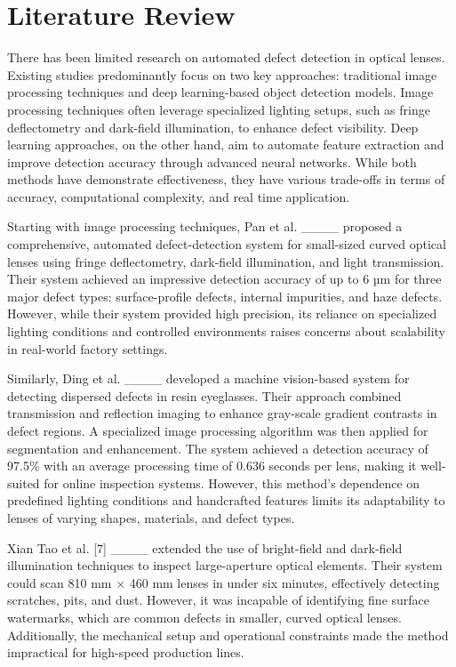 \section{Literature Review}
There has been limited research on automated defect detection in optical lenses. Existing studies predominantly focus on two key approaches: traditional image processing techniques and deep learning-based object detection models. Image processing techniques often leverage specialized lighting setups, such as fringe deflectometry and dark-field illumination, to enhance defect visibility. Deep learning approaches, on the other hand, aim to automate feature extraction and improve detection accuracy through advanced neural networks. While both methods have demonstrate effectiveness, they have various trade-offs in terms of accuracy, computational complexity, and real time application.

Starting with image processing techniques, Pan et al. ____ proposed a comprehensive, automated defect-detection system for small-sized curved optical lenses using fringe deflectometry, dark-field illumination, and light transmission. Their system achieved an impressive detection accuracy of up to 6 µm for three major defect types: surface-profile defects, internal impurities, and haze defects. However, while their system provided high precision, its reliance on specialized lighting conditions and controlled environments raises concerns about scalability in real-world factory settings.

Similarly, Ding et al. ____ developed a machine vision-based system for detecting dispersed defects in resin eyeglasses. Their approach combined transmission and reflection imaging to enhance gray-scale gradient contrasts in defect regions. A specialized image processing algorithm was then applied for segmentation and enhancement. The system achieved a detection accuracy of 97.5\% with an average processing time of 0.636 seconds per lens, making it well-suited for online inspection systems. However, this method's dependence on predefined lighting conditions and handcrafted features limits its adaptability to lenses of varying shapes, materials, and defect types.

Xian Tao et al. [7] ____ extended the use of bright-field and dark-field illumination techniques to inspect large-aperture optical elements. Their system could scan 810 mm × 460 mm lenses in under six minutes, effectively detecting scratches, pits, and dust. However, it was incapable of identifying fine surface watermarks, which are common defects in smaller, curved optical lenses. Additionally, the mechanical setup and operational constraints made the method impractical for high-speed production lines.

